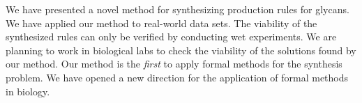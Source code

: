% 
We have presented a novel method for synthesizing production rules for glycans.
We have applied our method to real-world data sets. %
The viability of the synthesized rules can only be verified by conducting wet experiments.
We are planning to work in biological labs to check the viability of the solutions
found by our method.
Our method is the {\em first} to apply formal methods for the synthesis problem.
We have opened a new direction for the application of formal methods in biology.









